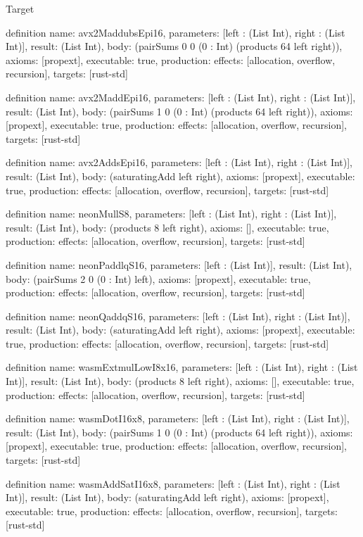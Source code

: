 \begin{lexlean}{Target}
\begin{semanticmodule}
definition{
  name: avx2MaddubsEpi16,
  parameters: [left : (List Int), right : (List Int)],
  result: (List Int),
  body: (pairSums 0 0 (0 : Int) (products 64 left right)),
  axioms: [propext],
  executable: true,
  production: {effects: [allocation, overflow, recursion], targets: [rust-std]}
}

definition{
  name: avx2MaddEpi16,
  parameters: [left : (List Int), right : (List Int)],
  result: (List Int),
  body: (pairSums 1 0 (0 : Int) (products 64 left right)),
  axioms: [propext],
  executable: true,
  production: {effects: [allocation, overflow, recursion], targets: [rust-std]}
}

definition{
  name: avx2AddsEpi16,
  parameters: [left : (List Int), right : (List Int)],
  result: (List Int),
  body: (saturatingAdd left right),
  axioms: [propext],
  executable: true,
  production: {effects: [allocation, overflow, recursion], targets: [rust-std]}
}

definition{
  name: neonMullS8,
  parameters: [left : (List Int), right : (List Int)],
  result: (List Int),
  body: (products 8 left right),
  axioms: [],
  executable: true,
  production: {effects: [allocation, overflow, recursion], targets: [rust-std]}
}

definition{
  name: neonPaddlqS16,
  parameters: [left : (List Int)],
  result: (List Int),
  body: (pairSums 2 0 (0 : Int) left),
  axioms: [propext],
  executable: true,
  production: {effects: [allocation, overflow, recursion], targets: [rust-std]}
}

definition{
  name: neonQaddqS16,
  parameters: [left : (List Int), right : (List Int)],
  result: (List Int),
  body: (saturatingAdd left right),
  axioms: [propext],
  executable: true,
  production: {effects: [allocation, overflow, recursion], targets: [rust-std]}
}

definition{
  name: wasmExtmulLowI8x16,
  parameters: [left : (List Int), right : (List Int)],
  result: (List Int),
  body: (products 8 left right),
  axioms: [],
  executable: true,
  production: {effects: [allocation, overflow, recursion], targets: [rust-std]}
}

definition{
  name: wasmDotI16x8,
  parameters: [left : (List Int), right : (List Int)],
  result: (List Int),
  body: (pairSums 1 0 (0 : Int) (products 64 left right)),
  axioms: [propext],
  executable: true,
  production: {effects: [allocation, overflow, recursion], targets: [rust-std]}
}

definition{
  name: wasmAddSatI16x8,
  parameters: [left : (List Int), right : (List Int)],
  result: (List Int),
  body: (saturatingAdd left right),
  axioms: [propext],
  executable: true,
  production: {effects: [allocation, overflow, recursion], targets: [rust-std]}
}


\end{semanticmodule}
\end{lexlean}
